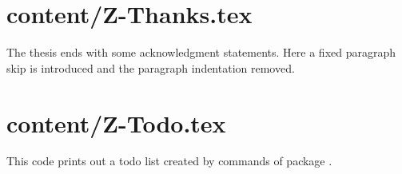 
\section{content/Z-Thanks.tex}

The thesis ends with some acknowledgment statements. Here a fixed paragraph skip is introduced and the paragraph indentation removed.


\section{content/Z-Todo.tex}

This code prints out a todo list created by commands of package .

